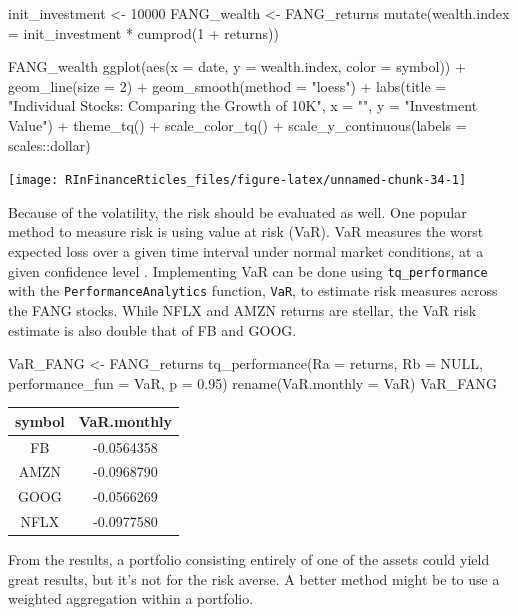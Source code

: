 \begin{Schunk}
\begin{Sinput}
init_investment <- 10000
FANG_wealth <- FANG_returns %
    mutate(wealth.index = init_investment * cumprod(1 + returns))

FANG_wealth %
    ggplot(aes(x = date, y = wealth.index, color = symbol)) +
    geom_line(size = 2) +
    geom_smooth(method = "loess") +
    labs(title = "Individual Stocks: Comparing the Growth of 10K",
         x = "", y = "Investment Value") +
    theme_tq() +
    scale_color_tq() +
    scale_y_continuous(labels = scales::dollar)
\end{Sinput}


\begin{center}\texttt{[image: RInFinanceRticles\_files/figure-latex/unnamed-chunk-34-1]} \end{center}

\end{Schunk}

Because of the volatility, the risk should be evaluated as well. One
popular method to measure risk is using value at risk (VaR). VaR
measures the worst expected loss over a given time interval under normal
market conditions, at a given confidence level \citep{Bacon2004}.
Implementing VaR can be done using \texttt{tq\_performance} with the
\texttt{PerformanceAnalytics} function, \texttt{VaR}, to estimate risk
measures across the FANG stocks. While NFLX and AMZN returns are
stellar, the VaR risk estimate is also double that of FB and GOOG.

\begin{Schunk}
\begin{Sinput}
VaR_FANG <- FANG_returns %
    tq_performance(Ra = returns, Rb = NULL, performance_fun = VaR, p = 0.95) %
    rename(VaR.monthly = VaR) 
VaR_FANG
\end{Sinput}
\end{Schunk}

\begin{tabular}{cc}
\toprule
symbol & VaR.monthly\\
\midrule
FB & -0.0564358\\
AMZN & -0.0968790\\
GOOG & -0.0566269\\
NFLX & -0.0977580\\
\bottomrule
\end{tabular}

\hspace{20 mm}

From the results, a portfolio consisting entirely of one of the assets
could yield great results, but it's not for the risk averse. A better
method might be to use a weighted aggregation within a portfolio.

